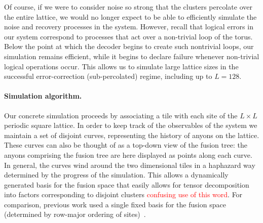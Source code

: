 \documentclass[aps, prl, letterpaper, twocolumn, superscriptaddress, notitlepage, 10pt]{revtex4-1}
\newcommand{\dude}[1]{\textcolor{red}{#1}}
\newcommand{\stf}[1]{\textcolor{green}{#1}}
\begin{document}
Of course, if we were to consider noise so strong that 
the clusters percolate over the entire lattice, we would no 
longer expect to be able to efficiently simulate the noise and recovery processes in the system. 
However, recall that logical errors in our system correspond to processes that act over a non-trivial loop of the torus. 
Below the point at which the decoder begins to create such nontrivial loops, our simulation remains efficient,
while it begins to declare failure whenever non-trivial logical 
operations occur. This allows us to simulate large lattice sizes 
in the successful error-correction (sub-percolated) regime, including up to $L=128$.

\paragraph{Simulation algorithm.}


Our concrete simulation proceeds by associating a tile with each site of the 
$L\times L$ periodic square lattice.
In order to keep track of the observables of the system 
we maintain a set of disjoint curves, representing the history of anyons on the lattice.
These curves can also be thought of as a top-down view of the fusion tree:
the anyons comprising the fusion tree are here displayed as points along each curve. 
In general, the curves wind around the two 
dimensional tiles in a haphazard way determined by the progress of the simulation.
This allows a dynamically generated basis for the fusion space that easily allows for tensor 
decomposition into factors corresponding 
to disjoint clusters \dude{confusing use of this word}.
For comparison, previous work 
used a single fixed basis for the fusion space (determined by row-major ordering of 
sites)~\cite{Brell2013}.
\end{document}
